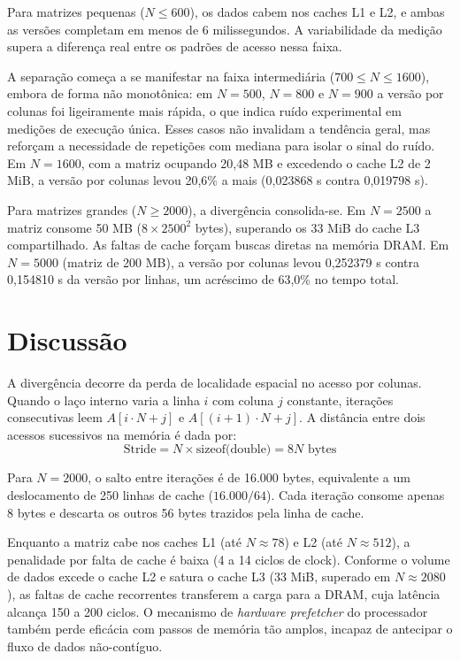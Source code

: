 \documentclass[11pt,letterpaper]{article}
\begin{document}
Para matrizes pequenas ($N \le 600$), os dados cabem nos caches L1 e L2, e ambas as versões completam em menos de 6 milissegundos. A variabilidade da medição supera a diferença real entre os padrões de acesso nessa faixa.

A separação começa a se manifestar na faixa intermediária ($700 \le N \le 1600$), embora de forma não monotônica: em $N=500$, $N=800$ e $N=900$ a versão por colunas foi ligeiramente mais rápida, o que indica ruído experimental em medições de execução única. Esses casos não invalidam a tendência geral, mas reforçam a necessidade de repetições com mediana para isolar o sinal do ruído. Em $N=1600$, com a matriz ocupando 20,48 MB e excedendo o cache L2 de 2 MiB, a versão por colunas levou 20,6\% a mais (0,023868 s contra 0,019798 s).

Para matrizes grandes ($N \ge 2000$), a divergência consolida-se. Em $N=2500$ a matriz consome 50 MB ($8 \times 2500^2$ bytes), superando os 33 MiB do cache L3 compartilhado. As faltas de cache forçam buscas diretas na memória DRAM. Em $N=5000$ (matriz de 200 MB), a versão por colunas levou 0,252379 s contra 0,154810 s da versão por linhas, um acréscimo de 63,0\% no tempo total.

\newpage
\section{Discussão}

A divergência decorre da perda de localidade espacial no acesso por colunas. Quando o laço interno varia a linha $i$ com coluna $j$ constante, iterações consecutivas leem $A[i \cdot N + j]$ e $A[(i+1) \cdot N + j]$. A distância entre dois acessos sucessivos na memória é dada por:
\[
\text{Stride} = N \times \text{sizeof(double)} = 8N \text{ bytes}
\]

Para $N=2000$, o salto entre iterações é de 16.000 bytes, equivalente a um deslocamento de 250 linhas de cache ($16.000 / 64$). Cada iteração consome apenas 8 bytes e descarta os outros 56 bytes trazidos pela linha de cache.

Enquanto a matriz cabe nos caches L1 (até $N \approx 78$) e L2 (até $N \approx 512$), a penalidade por falta de cache é baixa (4 a 14 ciclos de clock). Conforme o volume de dados excede o cache L2 e satura o cache L3 (33 MiB, superado em $N \approx 2080$), as faltas de cache recorrentes transferem a carga para a DRAM, cuja latência alcança 150 a 200 ciclos. O mecanismo de \textit{hardware prefetcher} do processador também perde eficácia com passos de memória tão amplos, incapaz de antecipar o fluxo de dados não-contíguo.
\end{document}
